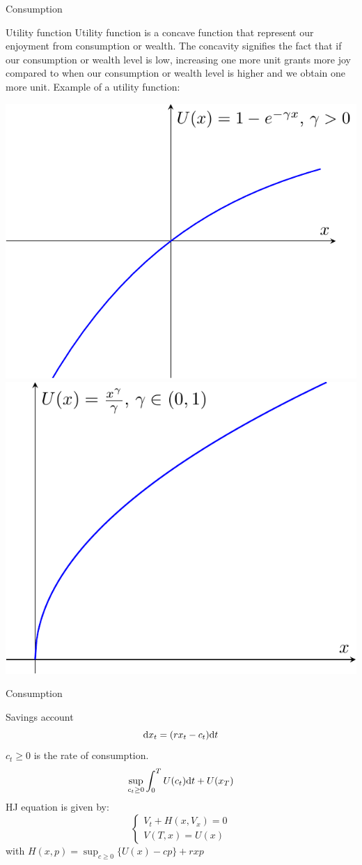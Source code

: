 \documentclass[color=usenames,dvipsnames]{beamer}
\newcommand{\dd}{\text{\normalfont d}}
\newcommand{\dt}{\text{\normalfont d}t}
\begin{document}
\begin{frame}{Consumption}
    \begin{block}
        {Utility function}
        Utility function is a concave function that represent our enjoyment from consumption or wealth. The concavity signifies the fact that if our consumption or wealth level is low, increasing one more unit grants more joy compared to when our consumption or wealth level is higher and we obtain one more unit.
        Example of a utility function:
        \begin{center}
            \includegraphics[width=0.35\linewidth]{Control_lecture_notes/Figs/utility1.pdf}
            \includegraphics[width=0.35\linewidth]{Control_lecture_notes/Figs/utility2.pdf}
        \end{center}
        
    \end{block}
\end{frame}


\begin{frame}{Consumption}
    \begin{block}
        {Savings account}
        \[
        \dd{x}_t = (rx_t - c_t)\dt
        \]
        $c_t\ge0$ is the rate of consumption.
        \[
        \sup_{c_t\ge0} \int_0^T U(c_t)\dt + U(x_T)
        \]
        HJ equation is given by:
        \[
        \begin{cases}
            V_t+H(x,V_x)=0\\
            V(T,x)=U(x)
        \end{cases}
        \]
        with $H(x,p)=\sup_{c\ge0}\{U(x)-cp\}+rxp$
    \end{block}
\end{frame}
\end{document}
